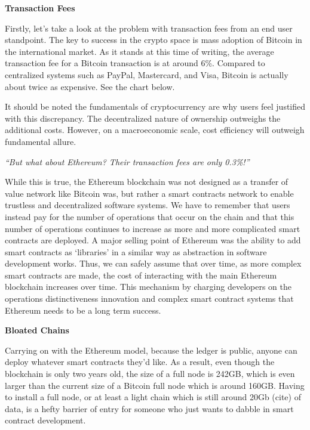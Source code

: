 \documentclass{%
	article}
\begin{document}
\begin{center}
\textbf{Transaction Fees}
\end{center}

Firstly, let’s take a look at the problem with transaction fees from an end user standpoint. The key to success in the crypto space is mass adoption of Bitcoin in the international market. As it stands at this time of writing, the average transaction fee for a Bitcoin transaction is at around 6\%. Compared to centralized systems such as PayPal, Mastercard, and Visa, Bitcoin is actually about twice as expensive. See the chart below.

It should be noted the fundamentals of cryptocurrency are why users feel justified with this discrepancy. The decentralized nature of ownership outweighs the additional costs. However, on a macroeconomic scale, cost efficiency will outweigh fundamental allure.

\begin{center}
\textit{“But what about Ethereum? Their transaction fees are only 0.3\%!”}
\end{center}
	
While this is true, the Ethereum blockchain was not designed as a transfer of value network like Bitcoin was, but rather a smart contracts network to enable trustless and decentralized software systems. We have to remember that users instead pay for the number of operations that occur on the chain and that this number of operations continues to increase as more and more complicated smart contracts are deployed. A major selling point of Ethereum was the ability to add smart contracts as ‘libraries’ in a similar way as abstraction in software development works. Thus, we can safely assume that over time, as more complex smart contracts are made, the cost of interacting with the main Ethereum blockchain increases over time. This mechanism by charging developers on the operations distinctiveness innovation and complex smart contract systems that Ethereum needs to be a long term success.

\begin{center}
\textbf{Bloated Chains}
\end{center}

Carrying on with the Ethereum model, because the ledger is public, anyone can deploy whatever smart contracts they’d like. As a result, even though the blockchain is only two years old, the size of a full node is 242GB, which is even larger than the current size of a Bitcoin full node which is around 160GB. Having to install a full node, or at least a light chain which is still around 20Gb (cite) of data, is a hefty barrier of entry for someone who just wants to dabble in smart contract development.
\end{document}

